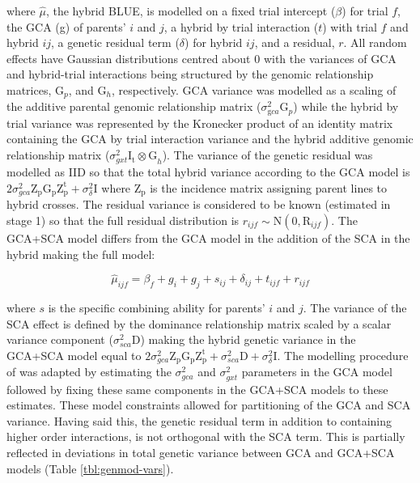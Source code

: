 \begin{refsection}
where \(\hat{\mu}\), the hybrid BLUE, is modelled on a fixed trial intercept (\(\beta\)) for trial \(f\), the GCA (g) of parents' \(i\) and \(j\), a hybrid by trial interaction (\(t\)) with trial \(f\) and hybrid \(ij\), a genetic residual term (\(\delta\)) for hybrid \(ij\), and a residual, \(r\). All random effects have Gaussian distributions centred about 0 with the variances of GCA and hybrid-trial interactions being structured by the genomic relationship matrices, \(\mathrm G_p\), and \(\mathrm G_h\), respectively. GCA variance was modelled as a scaling of the additive parental genomic relationship matrix (\(\sigma^2_{\mathrm gca}\mathrm{G}_p\)) while the hybrid by trial variance was represented by the Kronecker product of an identity matrix containing the GCA by trial interaction variance and the hybrid additive genomic relationship matrix (\(\sigma^2_{gxt} \mathrm{I_t \otimes G}_h\)). The variance of the genetic residual was modelled as IID so that the total hybrid variance according to the GCA model is \(2\sigma^2_{gca} \mathrm {Z_pG_pZ^t_p} +\sigma^2_{\delta}\mathrm I\) where \(\mathrm{Z_p}\) is the incidence matrix assigning parent lines to hybrid crosses. The residual variance is considered to be known (estimated in stage 1) so that the full residual distribution is \(r_{ijf}\sim\mathrm{N}(0,\mathrm R_{ijf})\). The GCA+SCA model differs from the GCA model in the addition of the SCA in the hybrid making the full model:

\begin{equation}
 \hat{\mu}_{ijf} = \beta_f + g_i+g_j+s_{ij}+\delta_{ij}+t_{ijf}+r_{ijf}
\label{eq:sca}
\end{equation}

where \(s\) is the specific combining ability for parents' \(i\) and \(j\). The variance of the SCA effect is defined by the dominance relationship matrix scaled by a scalar variance component (\(\sigma^2_{sca} \mathrm{D}\)) making the hybrid genetic variance in the GCA+SCA model equal to \(2\sigma^2_{gca}\mathrm{Z_pG_pZ_p^t}+\sigma^2_{sca}\mathrm{D}+\sigma^2_{\delta}\mathrm I\). The modelling procedure of \parencite{Endelman2018} was adapted by estimating the \(\sigma^2_{gca}\) and \(\sigma^2_{gxt}\) parameters in the GCA model followed by fixing these same components in the GCA+SCA models to these estimates. These model constraints allowed for partitioning of the GCA and SCA variance. Having said this, the genetic residual term in addition to containing higher order interactions, is not orthogonal with the SCA term. This is partially reflected in deviations in total genetic variance between GCA and GCA+SCA models (Table \ref{tbl:genmod-vars}).


\end{refsection}
